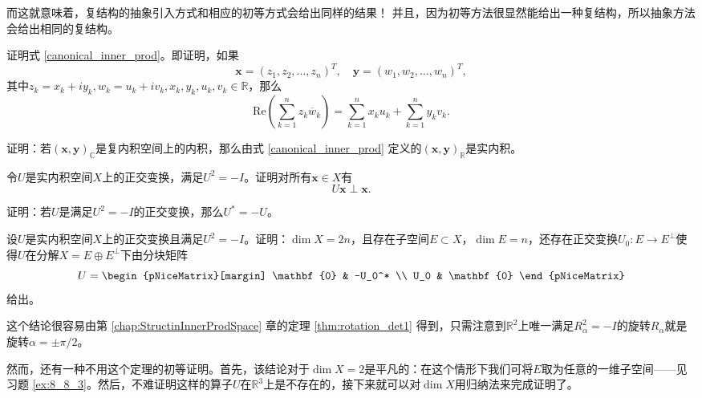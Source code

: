 而这就意味着，复结构的抽象引入方式和相应的初等方式会给出同样的结果！
并且，因为初等方法很显然能给出一种复结构，所以抽象方法会给出相同的复结构。

\begin{problemset}
    \item \label{ex:8_8_1} 证明式 \eqref{canonical_inner_prod}。即证明，如果
    \[\mathbf{x}=(z_1,z_2,\ldots,z_n)^T,\quad\mathbf{y}=(w_1,w_2,\ldots,w_n)^T,\]
    其中$z_{k}=x_{k}+iy_{k},w_{k}=u_{k}+iv_{k},x_{k},y_{k},u_{k},v_{k}\in\mathbb{R}$，那么\[\mathrm{Re}\left(\sum_{k=1}^nz_k\overline{w}_k\right)=\sum_{k=1}^nx_ku_k+\sum_{k=1}^ny_kv_k.\]
    \item 证明：若$(\mathbf{x},\mathbf{y})_\mathbb{C}$是复内积空间上的内积，那么由式 \eqref{canonical_inner_prod} 定义的$(\mathbf{x},\mathbf{y})_\mathbb{R}$是实内积。
    \item \label{ex:8_8_3} 令$U$是实内积空间$X$上的正交变换，满足$U^2=-I$。证明对所有$\mathbf{x}\in X$有\[U\mathbf{x}\perp\mathbf{x}.\]
    \item \label{ex:8_8_4} 证明：若$U$是满足$U^2=-I$的正交变换，那么$U^*=-U$。
    \item \label{ex:8_8_5} 设$U$是实内积空间$X$上的正交变换且满足$U^2=-I$。证明：$\dim X=2n$，且存在子空间$E\subset X$，$\dim E=n$，还存在正交变换$U_0:E\to E^\perp$使得$U$在分解$X=E\oplus E^\perp$下由分块矩阵
    \[U = \begin{pNiceMatrix}[margin]
    \mathbf{0} & -U_0^* \\ U_0 & \mathbf{0}
\end{pNiceMatrix}\]
    给出。
    
    这个结论很容易由第 \ref{chap:StructinInnerProdSpace} 章的定理 \ref{thm:rotation_det1} 得到，只需注意到$\mathbb{R}^2$上唯一满足$R_\alpha^2=-I$的旋转$R_\alpha$就是旋转$\alpha=\pm \pi/2$。

    然而，还有一种不用这个定理的初等证明。首先，该结论对于$\dim X=2$是平凡的：在这个情形下我们可将$E$取为任意的一维子空间——见习题 \ref{ex:8_8_3}。然后，不难证明这样的算子$U$在$\mathbb{R}^3$上是不存在的，接下来就可以对$\dim X$用归纳法来完成证明了。
\end{problemset}